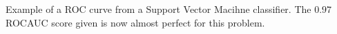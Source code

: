 Example of a ROC curve from a Support Vector Macihne classifier. The $0.97$ ROCAUC score given is now almost perfect for this problem.